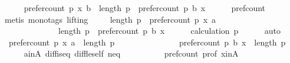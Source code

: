\begin{isabellebody}
\ {}{\isacharcolon}{\kern0pt}\isanewline
\ \ \ \ {\isachardoublequoteopen}prefer{\isacharunderscore}{\kern0pt}count\ p\ x\ b\ {\isacharequal}{\kern0pt}\ {\isacharparenleft}{\kern0pt}length\ p{\isacharparenright}{\kern0pt}\ {\isacharminus}{\kern0pt}\ {\isacharparenleft}{\kern0pt}prefer{\isacharunderscore}{\kern0pt}count\ p\ b\ x{\isacharparenright}{\kern0pt}{\isachardoublequoteclose}\isanewline
\ \ \ \ \isamarkupfalse%
\ pref{\isacharunderscore}{\kern0pt}count\isanewline
\ \ \ \ \isamarkupfalse%
\ {\isacharparenleft}{\kern0pt}metis\ {\isacharparenleft}{\kern0pt}mono{\isacharunderscore}{\kern0pt}tags{\isacharcomma}{\kern0pt}\ lifting{\isacharparenright}{\kern0pt}{\isacharparenright}{\kern0pt}\isanewline
\ \ \isamarkupfalse%
\ {}{\isacharcolon}{\kern0pt}\ {\isachardoublequoteopen}{\isacharparenleft}{\kern0pt}length\ p{\isacharparenright}{\kern0pt}\ {\isacharminus}{\kern0pt}\ {\isacharparenleft}{\kern0pt}prefer{\isacharunderscore}{\kern0pt}count\ p\ x\ a{\isacharparenright}{\kern0pt}\ {\isasymge}\isanewline
\ \ \ \ \ \ \ \ \ \ \ \ \ \ {\isacharparenleft}{\kern0pt}length\ p{\isacharparenright}{\kern0pt}\ {\isacharminus}{\kern0pt}\ {\isacharparenleft}{\kern0pt}prefer{\isacharunderscore}{\kern0pt}count\ p\ b\ x{\isacharparenright}{\kern0pt}{\isachardoublequoteclose}\isanewline
\ \ \ \ \isamarkupfalse%
\ calculation\ p{}\isanewline
\ \ \ \ \isamarkupfalse%
\ auto\isanewline
\ \ \isamarkupfalse%
\ {}{\isacharcolon}{\kern0pt}\ {\isachardoublequoteopen}{\isacharparenleft}{\kern0pt}prefer{\isacharunderscore}{\kern0pt}count\ p\ x\ a{\isacharparenright}{\kern0pt}\ {\isacharminus}{\kern0pt}\ {\isacharparenleft}{\kern0pt}length\ p{\isacharparenright}{\kern0pt}\ {\isasymle}\isanewline
\ \ \ \ \ \ \ \ \ \ \ \ \ \ {\isacharparenleft}{\kern0pt}prefer{\isacharunderscore}{\kern0pt}count\ p\ b\ x{\isacharparenright}{\kern0pt}\ {\isacharminus}{\kern0pt}\ {\isacharparenleft}{\kern0pt}length\ p{\isacharparenright}{\kern0pt}{\isachardoublequoteclose}\isanewline
\ \ \ \ \isamarkupfalse%
\ a{\isacharunderscore}{\kern0pt}in{\isacharunderscore}{\kern0pt}A\ diff{\isacharunderscore}{\kern0pt}is{\isacharunderscore}{\kern0pt}{}{\isacharunderscore}{\kern0pt}eq\ diff{\isacharunderscore}{\kern0pt}le{\isacharunderscore}{\kern0pt}self\ neq{}\isanewline
\ \ \ \ \ \ \ \ \ \ pref{\isacharunderscore}{\kern0pt}count\ prof\ x{\isacharunderscore}{\kern0pt}in{\isacharunderscore}{\kern0pt}A\isanewline
\ \ \ \ \isamarkupfalse%

\end{isabellebody}
